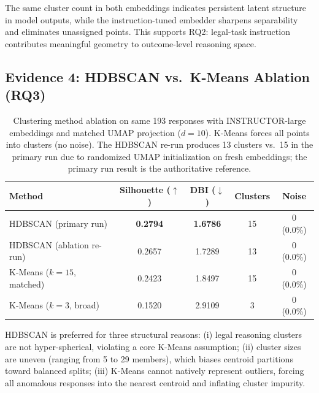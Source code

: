 \documentclass[11pt]{article}
\begin{document}
The same cluster count in both embeddings indicates persistent latent structure in model outputs, while the instruction-tuned embedder sharpens separability and eliminates unassigned points. This supports RQ2: legal-task instruction contributes meaningful geometry to outcome-level reasoning space.

\subsection{Evidence 4: HDBSCAN vs.\ K-Means Ablation (RQ3)}
\begin{table}[ht]
\centering
\caption{Clustering method ablation on same 193 responses with INSTRUCTOR-large embeddings and matched UMAP projection ($d=10$). K-Means forces all points into clusters (no noise). The HDBSCAN re-run produces 13 clusters vs.\ 15 in the primary run due to randomized UMAP initialization on fresh embeddings; the primary run result is the authoritative reference.}
\label{tab:kmeans_ablation}
\begin{tabular}{lcccc}
\toprule
Method & Silhouette ($\uparrow$) & DBI ($\downarrow$) & Clusters & Noise \\
\midrule
HDBSCAN (primary run) & \textbf{0.2794} & \textbf{1.6786} & 15 & 0 (0.0\%) \\
HDBSCAN (ablation re-run) & 0.2657 & 1.7289 & 13 & 0 (0.0\%) \\
K-Means ($k=15$, matched) & 0.2423 & 1.8497 & 15 & 0 (0.0\%) \\
K-Means ($k=3$, broad) & 0.1520 & 2.9109 & 3 & 0 (0.0\%) \\
\bottomrule
\end{tabular}
\end{table}

HDBSCAN is preferred for three structural reasons: (i) legal reasoning clusters are not hyper-spherical, violating a core K-Means assumption; (ii) cluster sizes are uneven (ranging from 5 to 29 members), which biases centroid partitions toward balanced splits; (iii) K-Means cannot natively represent outliers, forcing all anomalous responses into the nearest centroid and inflating cluster impurity.
\end{document}
